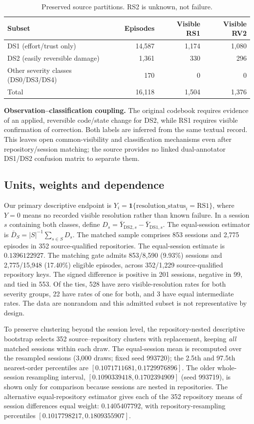 \begin{table}[h!]
\centering\small
\caption{Preserved source partitions. RS2 is unknown, not failure.}
\label{tab:appendix-source-partitions}
\begin{tabular}{lrrr}
\toprule
Subset & Episodes & Visible RS1 & Visible RV2\\\midrule
DS1 (effort/trust only) & 14,587 & 1,174 & 1,080\\
DS2 (easily reversible damage) & 1,361 & 330 & 296\\
Other severity classes (DS0/DS3/DS4) & 170 & 0 & 0\\
\midrule
Total & 16,118 & 1,504 & 1,376\\
\bottomrule
\end{tabular}
\end{table}

\noindent\textbf{Observation--classification coupling.} The original codebook requires evidence of an applied, reversible code/state change for DS2, while RS1 requires visible confirmation of correction. Both labels are inferred from the same textual record. This leaves open common-visibility and classification mechanisms even after repository/session matching; the source provides no linked dual-annotator DS1/DS2 confusion matrix to separate them.

\subsection{Units, weights and dependence}\label{app:weights}
Our primary descriptive endpoint is $Y_i=\mathbf{1}\{\mathrm{resolution\_status}_i=\mathrm{RS1}\}$, where $Y=0$ means no recorded visible resolution rather than known failure. In a session $s$ containing both classes, define $D_s=\bar{Y}_{\mathrm{DS2},s}-\bar{Y}_{\mathrm{DS1},s}$. The equal-session estimator is $\bar{D}_{S}=|S|^{-1}\sum_{s\in S} D_s$. The matched sample comprises 853 sessions and 2,775 episodes in 352 source-qualified repositories. The equal-session estimate is $0.1396122927$. The matching gate admits 853/8,590 (9.93\%) sessions and 2,775/15,948 (17.40\%) eligible episodes, across 352/1,229 source-qualified repository keys. The signed difference is positive in 201 sessions, negative in 99, and tied in 553. Of the ties, 528 have zero visible-resolution rates for both severity groups, 22 have rates of one for both, and 3 have equal intermediate rates. The data are nonrandom and this admitted subset is not representative by design.

To preserve clustering beyond the session level, the repository-nested descriptive bootstrap selects 352 source--repository clusters with replacement, keeping \emph{all} matched sessions within each draw. The equal-session mean is recomputed over the resampled sessions (3,000 draws; fixed seed 993720); the 2.5th and 97.5th nearest-order percentiles are $[0.1071711681,0.1729976896]$. The older whole-session resampling interval, $[0.1090339418,0.1702394909]$ (seed 993719), is shown only for comparison because sessions are nested in repositories. The alternative equal-repository estimator gives each of the 352 repository means of session differences equal weight: $0.1405407792$, with repository-resampling percentiles $[0.1017798217,0.1809355907]$.

